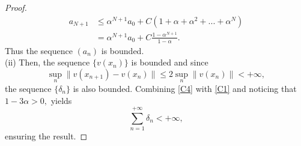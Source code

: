 \documentclass[10pt,a4paper]{amsart}
\begin{document}
\begin{proof}
\begin{align*}
	a_{N+1}&\leq \alpha^{N+1}a_{0}+C(1+\alpha+\alpha^2+...+\alpha^{N})
	\\
	&=\alpha^{N+1}a_{0}+C\frac{1-\alpha^{N+1}}{1-\alpha}.
	\end{align*}
	{Thus the sequence $(a_n)$ is bounded}.\\
	(ii) Then, the sequence $\{v(x_n)\}$ is bounded and since 
	\begin{equation}\label{C4}
	\sup_n\|v(x_{n+1})-v(x_n)\|\leq 2\sup_n\|v(x_n)\| <+\infty,
	\end{equation} 
	the sequence $\{\delta_n\}$ is also bounded.
	Combining \eqref{C4}  with \eqref{C1} and noticing that $1-3\alpha>0,$ yields  
	$$\sum_{n=1}^{+\infty}\delta_n<+\infty,$$
	ensuring the result. 
\end{proof}  
\end{document}
